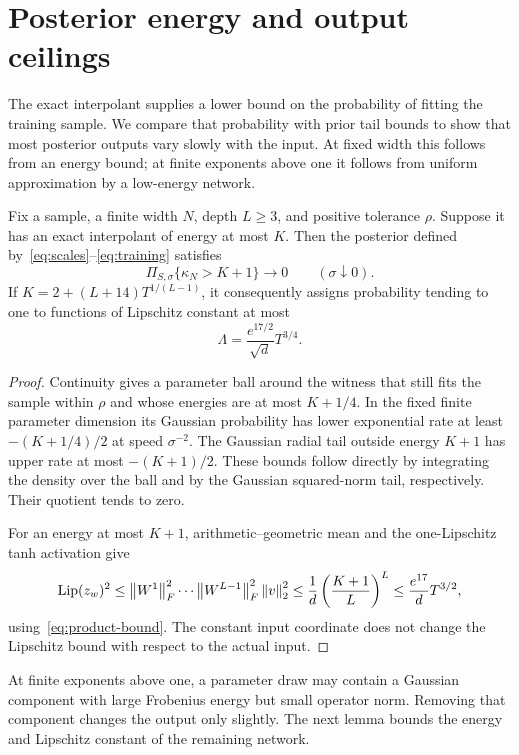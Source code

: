 \section{Posterior energy and output ceilings}\label{sec:posterior}
The exact interpolant supplies a lower bound on the probability of
fitting the training sample. We compare that probability with prior
tail bounds to show that most posterior outputs vary slowly with the
input. At fixed width this follows from an energy bound; at finite
exponents above one it follows from uniform approximation by a
low-energy network.
\begin{lemma}\label{lem:strong-ceiling}
Fix a sample, a finite width $N$, depth $L\ge3$, and positive tolerance
$\rho$. Suppose it has an exact interpolant of energy at most $K$.
Then the posterior defined by~\eqref{eq:scales}--\eqref{eq:training}
satisfies
\[
 \Pi_{S,\sigma}\{\kappa_N>K+1\}\longrightarrow0
 \qquad(\sigma\downarrow0).
\]
If $K=2+(L+14)T^{1/(L-1)}$, it consequently assigns probability
tending to one to functions of Lipschitz constant at most
\begin{equation}\label{eq:Lip-ceiling}
 \Lambda=\frac{e^{17/2}}{\sqrt d}T^{3/4}.
\end{equation}
\end{lemma}
\begin{proof}
Continuity gives a parameter ball around the witness that still fits
the sample within $\rho$ and whose energies are at most $K+1/4$.
In the fixed finite parameter dimension its Gaussian probability has
lower exponential rate at least $-(K+1/4)/2$ at speed $\sigma^{-2}$.
The Gaussian radial tail outside energy $K+1$ has upper rate at most
$-(K+1)/2$. These bounds follow directly by integrating the density
over the ball and by the Gaussian squared-norm tail, respectively.
Their quotient tends to zero.

For an energy at most $K+1$, arithmetic--geometric mean and the
one-Lipschitz tanh activation give
\[
 \mathrm{Lip}(z_w)^2\le
 \left\Vert W^1\right\Vert_F^2\cdots\left\Vert W^{L-1}\right\Vert_F^2\left\Vert v\right\Vert_2^2
 \le\frac1d\left(\frac{K+1}{L}\right)^L
 \le\frac{e^{17}}dT^{3/2},
\]
using~\eqref{eq:product-bound}. The constant input coordinate does
not change the Lipschitz bound with respect to the actual input.
\end{proof}

At finite exponents above one, a parameter draw may contain a Gaussian
component with large Frobenius energy but small operator norm. Removing
that component changes the output only slightly. The next lemma bounds
the energy and Lipschitz constant of the remaining network.

